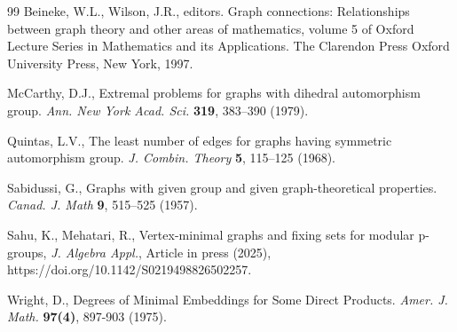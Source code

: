 \documentclass[12pt]{article}
\theoremstyle{plain}
\theoremstyle{definition}
\begin{document}
\begin{thebibliography}{99}
		Beineke, W.L., Wilson, J.R., editors. Graph connections: Relationships between graph theory and other areas of mathematics, volume 5 of Oxford Lecture Series in Mathematics and its Applications. The Clarendon Press Oxford University Press, New York, 1997.
		
		McCarthy, D.J., Extremal problems for graphs with dihedral automorphism group.
		\textit{Ann. New York Acad. Sci.} \textbf{319}, 383–390 (1979). 
		
		
		
		
		
		
		
		
		
		
		
		
		
		
		Quintas, L.V., The least number of edges for graphs having symmetric automorphism group. \textit{J. Combin. Theory} \textbf{5}, 115–125 (1968).
		
		
		
		Sabidussi, G., Graphs with given group and given graph-theoretical properties.  \textit{Canad. J. Math} \textbf{9}, 515–525 (1957).
		
		Sahu, K., Mehatari, R., Vertex-minimal graphs and fixing sets for modular p-groups, \textit{J. Algebra Appl.}, Article in press (2025),
		https://doi.org/10.1142/S0219498826502257.
		
		Wright, D., Degrees of Minimal Embeddings for Some Direct Products.
		\textit{Amer. J. Math.} \textbf{ 97(4)}, 897-903 (1975).
		
		
	\end{thebibliography}
	
	
	
	
	
	
\end{document}

